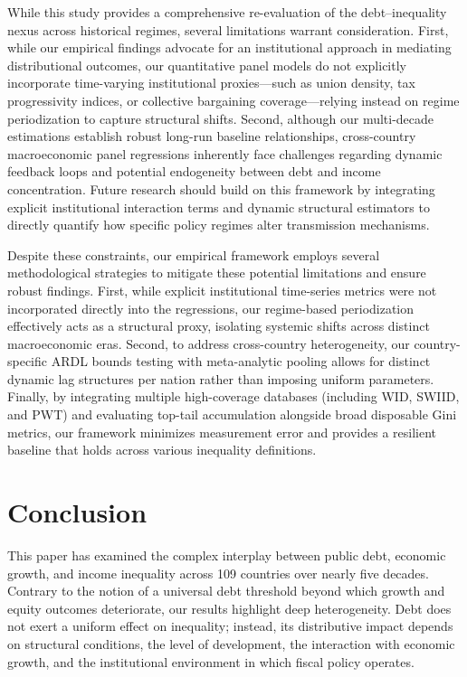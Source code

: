 \documentclass[12pt, titlepage]{article}
\numberwithin{equation}{section}
\begin{document}
   While this study provides a comprehensive re-evaluation of the debt–inequality nexus across historical regimes, several limitations warrant consideration.  First, while our empirical findings advocate for an institutional approach in mediating distributional outcomes, our quantitative panel models do not explicitly incorporate time-varying institutional proxies—such as union density, tax progressivity indices, or collective bargaining coverage—relying instead on regime periodization to capture structural shifts. Second, although our multi-decade estimations establish robust long-run baseline relationships, cross-country macroeconomic panel regressions inherently face challenges regarding dynamic feedback loops and potential endogeneity between debt and income concentration. Future research should build on this framework by integrating explicit institutional interaction terms and dynamic structural estimators to directly quantify how specific policy regimes alter transmission mechanisms.  
   
   Despite these constraints, our empirical framework employs several methodological strategies to mitigate these potential limitations and ensure robust findings. First, while explicit institutional time-series metrics were not incorporated directly into the regressions, our regime-based periodization effectively acts as a structural proxy, isolating systemic shifts across distinct macroeconomic eras. Second, to address cross-country heterogeneity, our country-specific ARDL bounds testing with meta-analytic pooling allows for distinct dynamic lag structures per nation rather than imposing uniform parameters. Finally, by integrating multiple high-coverage databases (including WID, SWIID, and PWT) and evaluating top-tail accumulation alongside broad disposable Gini metrics, our framework minimizes measurement error and provides a resilient baseline that holds across various inequality definitions.

	\section{Conclusion}

	This paper has examined the complex interplay between public debt, economic growth, and income inequality across 109 countries over nearly five decades. Contrary to the notion of a universal debt threshold beyond which growth and equity outcomes deteriorate, our results highlight deep heterogeneity. Debt does not exert a uniform effect on inequality; instead, its distributive impact depends on structural conditions, the level of development, the interaction with economic growth, and the institutional environment in which fiscal policy operates.
\end{document}
